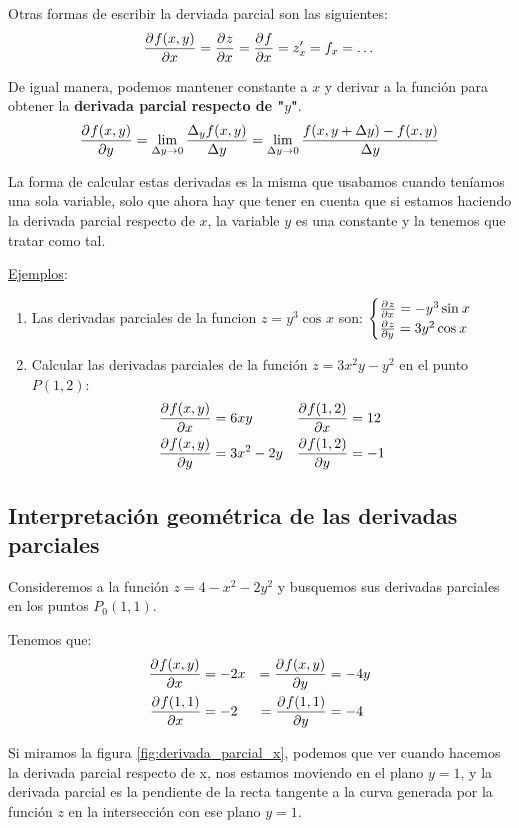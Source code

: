 \documentclass[12pt]{article}
\begin{document}
Otras formas de escribir la derviada parcial son las siguientes:
\[
\pdv[]{f(x,y)}{x} = \pdv[]{z}{x} = \pdv[]{f}{x} = z_{x}^\prime = f_{x} = \dots
\]

De igual manera, podemos mantener constante a $ x $ y derivar a la función para obtener la \textbf{derivada parcial respecto de "$ y $"}.
\[
\pdv[]{f(x,y)}{y} = \lim_{\Delta y \to 0}{\frac{\Delta_{y}f(x,y)}{\Delta y}} = \lim_{\Delta y \to 0}{\frac{f(x,y + \Delta y) - f(x,y)}{\Delta y}}
\]

La forma de calcular estas derivadas es la misma que usabamos cuando teníamos una sola variable, solo que ahora hay que tener en cuenta que si estamos haciendo la derivada parcial respecto de $ x $, la variable $ y $ es una constante y la tenemos que tratar como tal.

\underline{Ejemplos}:
\begin{enumerate}[1.]
  \item Las derivadas parciales de la funcion $ z = y^{3}\cos^{}x $ son: 
	$
	\begin{cases}
	  \pdv[]{z}{x} = -y^{3}\sin^{}x \\
	  \pdv[]{z}{y} = 3y^{2}\cos^{}x
	\end{cases}
	$

  \item Calcular las derivadas parciales de la función $ z = 3x^{2}y - y^{2} $ en el punto $ P(1,2) $:
\begin{align*}
	\pdv[]{f(x,y)}{x} & = 6xy & \pdv[]{f(1,2)}{x} & = 12 \\ 
	\pdv[]{f(x,y)}{y} & = 3x^{2} - 2y & \pdv[]{f(1,2)}{y} & = -1 
\end{align*}
	  
\end{enumerate}


\subsection{Interpretación geométrica de las derivadas parciales}
Consideremos a la función $ z = 4 - x^{2} - 2y^{2} $ y busquemos sus derivadas parciales en los puntos $ P_{0}(1,1) $.

Tenemos que:
\begin{align*}
	\pdv[]{f(x,y)}{x} &= -2x &= \pdv[]{f(x,y)}{y} &= -4y\\
	\pdv[]{f(1,1)}{x} &= -2 &= \pdv[]{f(1,1)}{y} &= -4
\end{align*}

Si miramos la figura \ref{fig:derivada_parcial_x}, podemos que ver cuando hacemos la derivada parcial respecto de x, nos estamos moviendo en el plano $ y = 1 $, y la derivada parcial es la pendiente de la recta tangente a la curva generada por la función $ z $ en la intersección con ese plano $ y = 1 $.
\end{document}
